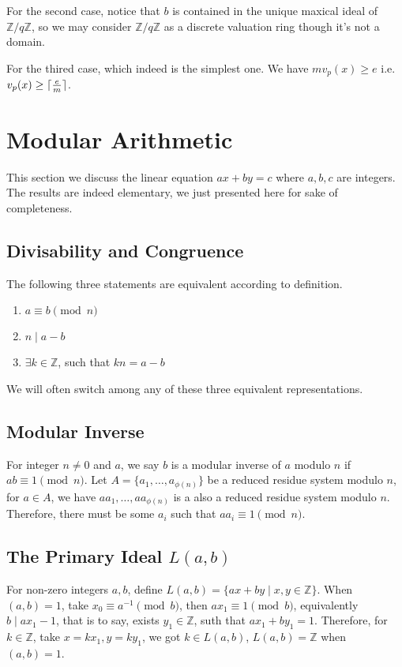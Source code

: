 \documentclass{article}
\def\ceil#1{\lceil {#1} \rceil}
\def\zmod#1{\mathbb Z / {#1} \mathbb Z}
\begin{document}
For the second case, notice that $b$ is contained in the unique maxical ideal of $\zmod q$,
so we may consider $\zmod q$ as a discrete valuation ring though it's not a domain.

For the thired case, which indeed is the simplest one. We have $m v_p(x) \geq e$
i.e. $v_p(x) \geq \ceil{e \over m}$.

\section{Modular Arithmetic}
This section we discuss the linear equation $ax + by = c$ where $a, b, c$ are integers.
The results are indeed elementary, we just presented here for sake of completeness.

\subsection{Divisability and Congruence}
The following three statements are equivalent according to definition.
\begin{enumerate}
\item $a \equiv b \pmod n$
\item $n \mid a - b$
\item $\exists k \in \mathbb Z$, such that $kn = a - b$
\end{enumerate}

We will often switch among any of these three equivalent representations.

\subsection{Modular Inverse}
For integer $n \neq 0$ and $a$, we say $b$ is a modular inverse of $a$ modulo $n$ if $ab \equiv 1 \pmod n$.
Let $A = \{a_1, \dots, a_{\phi(n)}\}$ be a reduced residue system modulo $n$,
for $a \in A$, we have $aa_1, \dots, aa_{\phi(n)}$ is a also a reduced residue system modulo $n$.
Therefore, there must be some $a_i$ such that $aa_i \equiv 1 \pmod n$.


\subsection{The Primary Ideal $L(a, b)$}
For non-zero integers $a, b$, define $L(a, b) = \{ax + by \mid x, y \in \mathbb Z\}$.
When $(a, b) = 1$, take $x_0 \equiv a^{-1} \pmod b$, then $ax_1 \equiv 1 \pmod b$,
equivalently $b \mid ax_1 - 1$, that is to say, exists $y_1 \in \mathbb Z$, suth that $ax_1 + by_1 = 1$.
Therefore, for $k \in \mathbb Z$, take $x = kx_1, y = ky_1$, we got $k \in L(a, b)$,
$L(a, b) = \mathbb Z$ when $(a, b) = 1$.
\end{document}
